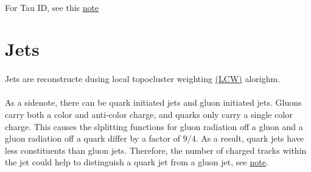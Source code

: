 \paragraph{}
For Tau ID, see this \href{https://cds.cern.ch/record/2248454/files/ATLAS-COM-CONF-2017-015.pdf}{note}

\section{Jets}
\paragraph{}
Jets are reconstructe dusing local topocluster weighting \href{https://arxiv.org/abs/1603.02934}{(LCW)} alorighm. 

\paragraph{}
As a sidenote, there can be quark initiated jets and gluon initiated jets. Gluons carry both a color and anti-color charge, and quarks only carry a single color charge. This causes the slplitting functions for gluon radiation off a gluon and a gluon radiation off a quark differ by a factor of $9/4$. As a result, quark jets have less constituents than gluon jets. Therefore, the number of charged tracks within the jet could help to distinguish a quark jet from a gluon jet, see \href{https://cds.cern.ch/record/2253972/files/ATL-COM-PHYS-2017-196.pdf}{note}. 

